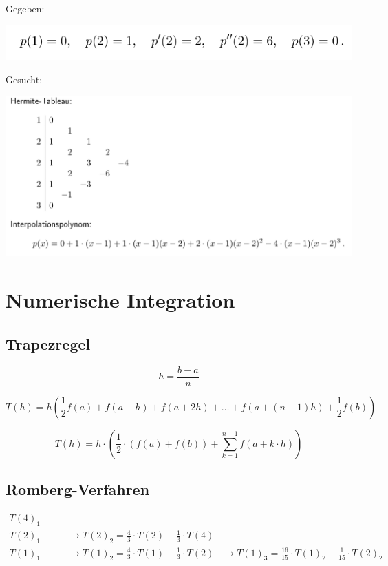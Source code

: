 \documentclass[a4paper, twoside]{article}
\begin{document}
Gegeben:

{\centering\includegraphics[width=.5\textwidth]{hermite_geg}\par}

Gesucht:

{\centering\includegraphics[width=.9\textwidth]{hermite_ges}\par}

\section{Numerische Integration}

\subsection{Trapezregel}

\[h = \frac{b-a}{n}\]

\[T(h) = h\left(\frac{1}{2}f(a) + f(a+h) + f(a+2h) + \ldots + f(a + (n-1)h) + \frac{1}{2}f(b)\right)\]

\[T(h) = h \cdot \left( \frac{1}{2} \cdot (f(a) + f(b)) + \sum_{k=1}^{n-1} f(a + k \cdot h)\right)\]


\subsection{Romberg-Verfahren}

\begin{align*}
  T(4)_{1} &&\\
  T(2)_{1} & \qquad\rightarrow T(2)_{2} = \frac{4}{3} \cdot T(2) - \frac{1}{3} \cdot T(4) &&\\
  T(1)_{1} & \qquad\rightarrow T(1)_{2} = \frac{4}{3} \cdot T(1) - \frac{1}{3} \cdot T(2) & \rightarrow T(1)_{3} = \frac{16}{15} \cdot T(1)_{2} - \frac{1}{15} \cdot T(2)_{2}
\end{align*}
\end{document}
